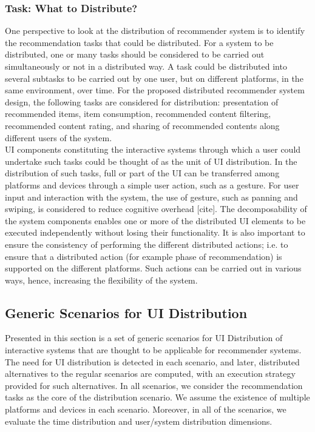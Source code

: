 \subsubsection{Task: What to Distribute?} 
One perspective to look at the distribution of recommender system is to identify the recommendation tasks that could be distributed. For a system to be distributed, one or many tasks should be considered to be carried out simultaneously or not in a distributed way. A task could be distributed into several subtasks to be carried out by one user, but on different platforms, in the same environment, over time. 
For the proposed distributed recommender system design, the following tasks are considered for distribution: presentation of recommended items, item consumption, recommended content filtering, recommended content rating, and sharing of recommended contents along different users of the system.\\ 
UI components constituting the interactive systems through which a user could undertake such tasks could be thought of as the unit of UI distribution. In the distribution of such tasks, full or part of the UI can be transferred among platforms and devices through a simple user action, such as a gesture. For user input and interaction with the system, the use of gesture, such as panning and swiping, is considered to reduce cognitive overhead [cite]. The decomposability of the system components enables one or more of the distributed UI elements to be executed independently without losing their functionality. It is also important to ensure the consistency of performing the different distributed actions; i.e. to ensure that a distributed action (for example phase of recommendation) is supported on the different platforms. Such actions can be carried out in various ways, hence, increasing the flexibility of the system. \\

\subsection{Generic Scenarios for UI Distribution}
Presented in this section is a set of generic scenarios for UI Distribution of interactive systems that are thought to be applicable for recommender systems. The need for UI distribution is detected in each scenario, and later, distributed alternatives to the regular scenarios are computed, with an execution strategy provided for such alternatives. In all scenarios, we consider the recommendation tasks as the core of the distribution scenario. We assume the existence of multiple platforms and devices in each scenario. Moreover, in all of the scenarios, we evaluate the time distribution and user/system distribution dimensions. 
  
